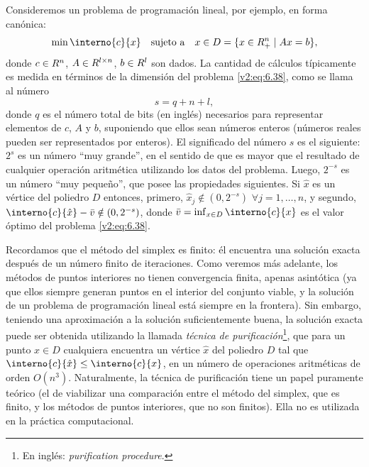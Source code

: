 Consideremos un problema de programación lineal, por ejemplo, en forma canónica:
\begin{equation}
    \min \interno{c}{x} \quad \text{sujeto a} \quad x \in D = \{ x \in \R^n_+ \mid Ax = b \},
    \label{v2:eq:6.38}
\end{equation}
donde $c \in R^n$, $A \in R^{l \times n}$, $b \in R^l$ son dados. La cantidad de cálculos típicamente es medida en términos de la dimensión del problema \eqref{v2:eq:6.38}, como se llama al número
\[
    s = q + n + l,
\]
donde $q$ es el número total de bits (en inglés) necesarios para representar elementos de $c$, $A$ y $b$, suponiendo que ellos sean números enteros (números reales pueden ser representados por enteros). El significado del número $s$ es el siguiente: $2^s$ es un número ``muy grande'', en el sentido de que es mayor que el resultado de cualquier operación aritmética utilizando los datos del problema. Luego, $2^{-s}$ es un número ``muy pequeño'', que posee las propiedades siguientes. Si $\hat{x}$ es un vértice del poliedro $D$ entonces, primero, $\hat{x}_j \notin (0, 2^{-s})$ $\forall j = 1, \dots, n$, y segundo, $\interno{c}{\hat{x}} - \bar{v} \notin (0, 2^{-s})$, donde $\bar{v} = \inf_{x \in D} \interno{c}{x}$ es el valor óptimo del problema \eqref{v2:eq:6.38}.

Recordamos que el método del simplex es finito: él encuentra una solución exacta después de un número finito de iteraciones. Como veremos más adelante, los métodos de puntos interiores no tienen convergencia finita, apenas asintótica (ya que ellos siempre generan puntos en el interior del conjunto viable, y la solución de un problema de programación lineal está siempre en la frontera). Sin embargo, teniendo una aproximación a la solución suficientemente buena, la solución exacta puede ser obtenida utilizando la llamada \textit{técnica de purificación}\footnote{En inglés: \textit{purification procedure}.}, que para un punto $x \in D$ cualquiera encuentra un vértice $\hat{x}$ del poliedro $D$ tal que $\interno{c}{\hat{x}} \le \interno{c}{x}$, en un número de operaciones aritméticas de orden $O(n^3)$. Naturalmente, la técnica de purificación tiene un papel puramente teórico (el de viabilizar una comparación entre el método del simplex, que es finito, y los métodos de puntos interiores, que no son finitos). Ella no es utilizada en la práctica computacional.

